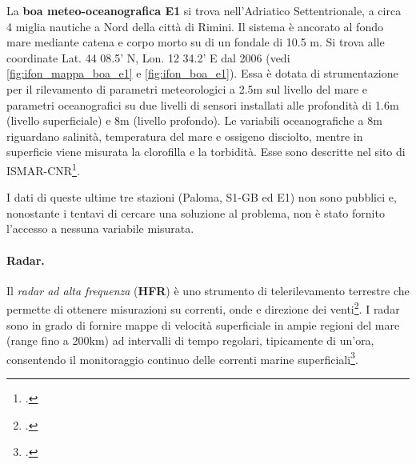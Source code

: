 \documentclass[./main.tex]{subfiles}
\begin{document}
La \textbf{boa meteo-oceanografica E1} si trova nell'Adriatico Settentrionale, a circa 4 miglia nautiche a Nord della città di Rimini. Il sistema è ancorato al fondo mare mediante catena e corpo morto su di un fondale di 10.5 m. Si trova alle coordinate Lat. 44 08.5' N, Lon. 12 34.2' E dal 2006 (vedi \autoref{fig:ifon_mappa_boa_e1} e \autoref{fig:ifon_boa_e1}). Essa è dotata di strumentazione per il rilevamento di parametri meteorologici a 2.5m sul livello del mare e parametri oceanografici su due livelli di sensori  installati alle profondità di 1.6m
(livello superficiale) e 8m (livello profondo). Le variabili oceanografiche a 8m riguardano salinità, temperatura del mare e ossigeno disciolto, mentre in superficie viene misurata la clorofilla e la torbidità. Esse sono descritte nel sito di ISMAR-CNR\footcite[\url{https://www.ismar.cnr.it/infrastrutture/infrastrutture-oceanografiche/boa-e1/}]{website-ismar-cnr}.\par

I dati di queste ultime tre stazioni (Paloma, S1-GB ed E1) non sono pubblici e, nonostante i tentavi di cercare una soluzione al problema, non è stato fornito l'accesso a nessuna variabile misurata.\par

\paragraph{Radar.}
Il \textit{radar ad alta frequenza} (\textbf{HFR}) è uno strumento di telerilevamento terrestre che permette di ottenere misurazioni su correnti, onde e direzione dei venti\footcite[2]{10.3389/fmars.2017.00008}.
I radar sono in grado di fornire mappe di velocità superficiale in ampie regioni del mare (range fino a 200km) ad intervalli di tempo regolari, tipicamente di un’ora, consentendo il monitoraggio continuo delle correnti marine superficiali\footcite[\url{https://www.ismar.cnr.it/infrastrutture/infrastrutture-oceanografiche/rete-radar-costiera/}]{website-ismar-cnr}.
\end{document}
